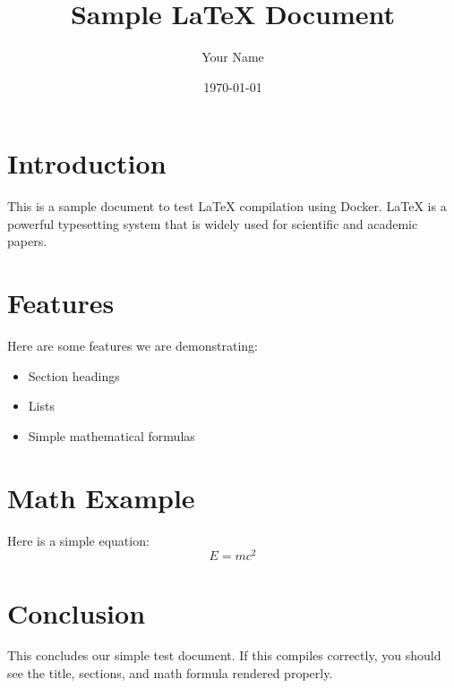 \documentclass{article}
\title{Sample LaTeX Document}
\author{Your Name}
\date{\today}
\begin{document}
\maketitle

\section{Introduction}
This is a sample document to test LaTeX compilation using Docker. LaTeX is a powerful typesetting system that is widely used for scientific and academic papers.

\section{Features}
Here are some features we are demonstrating:
\begin{itemize}
    \item Section headings
    \item Lists
    \item Simple mathematical formulas
\end{itemize}

\section{Math Example}
Here is a simple equation:
\begin{equation}
    E = mc^2
\end{equation}

\section{Conclusion}
This concludes our simple test document. If this compiles correctly, you should see the title, sections, and math formula rendered properly.
\end{document}

